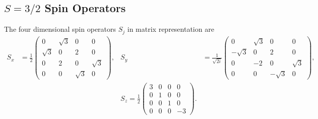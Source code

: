 \subsection{$S=3/2$ Spin Operators}
The four dimensional  spin operators $S_j$ in matrix representation are
\begin{equation}
    \begin{align}
        S_x &= \frac{1}{2} \begin{pmatrix}
            0 & \sqrt{3} & 0 & 0 \\
            \sqrt{3} & 0 & 2 & 0  \\
            0 & 2 & 0 & \sqrt{3} \\ 
            0 & 0 & \sqrt{3} & 0
        \end{pmatrix},&
            S_y &= \frac{1}{\sqrt{2i}} \begin{pmatrix}
                0 & \sqrt{3} & 0 & 0   \\
                -\sqrt{3} & 0  & 2 & 0 \\
                0 & -2 & 0 & \sqrt{3}\\ 
                0 & 0 & -\sqrt{3} & 0
		\end{pmatrix}, \\
                &
        &S_z = \frac{1}{2} \begin{pmatrix}
            3 & 0 & 0 & 0   \\
            0 & 1 & 0 & 0  \\
            0 & 0 & 1 & 0  \\
            0 & 0 & 0 & -3
		\end{pmatrix}.
        &
    \end{align}
	\label{eq:s1.5_spin_operators}
\end{equation}
